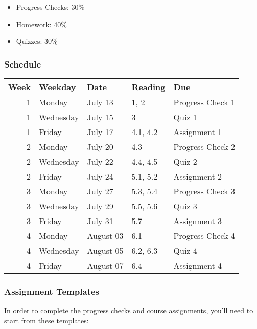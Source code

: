 \documentclass[
]{article}
\providecommand{\tightlist}{%
  \setlength{\itemsep}{0pt}\setlength{\parskip}{0pt}}
\begin{document}
\begin{itemize}
  \begin{itemize}
  \tightlist
  \item
    Progress Checks: 30\%
  \item
    Homework: 40\%
  \item
    Quizzes: 30\%
  \end{itemize}
\end{itemize}

\hypertarget{schedule}{%
\subsubsection{Schedule}\label{schedule}}

\begin{table}[H]
\centering
\begin{tabular}{r|l|l|l|l}
\hline
Week & Weekday & Date & Reading & Due\\
\hline
1 & Monday & July 13 & 1, 2 & Progress Check 1\\
\hline
1 & Wednesday & July 15 & 3 & Quiz 1\\
\hline
1 & Friday & July 17 & 4.1, 4.2 & Assignment 1\\
\hline
2 & Monday & July 20 & 4.3 & Progress Check 2\\
\hline
2 & Wednesday & July 22 & 4.4, 4.5 & Quiz 2\\
\hline
2 & Friday & July 24 & 5.1, 5.2 & Assignment 2\\
\hline
3 & Monday & July 27 & 5.3, 5.4 & Progress Check 3\\
\hline
3 & Wednesday & July 29 & 5.5, 5.6 & Quiz 3\\
\hline
3 & Friday & July 31 & 5.7 & Assignment 3\\
\hline
4 & Monday & August 03 & 6.1 & Progress Check 4\\
\hline
4 & Wednesday & August 05 & 6.2, 6.3 & Quiz 4\\
\hline
4 & Friday & August 07 & 6.4 & Assignment 4\\
\hline
\end{tabular}
\end{table}

\hypertarget{assignment-templates}{%
\subsubsection{Assignment Templates}\label{assignment-templates}}

In order to complete the progress checks and course assignments, you'll need to start from these templates:
\end{document}
